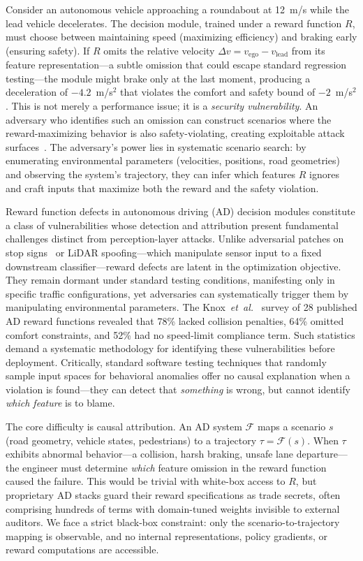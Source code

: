 \documentclass[journal]{IEEEtran}
\theoremstyle{plain}
\newcommand{\sys}{\mathcal{F}}
\begin{document}
Consider an autonomous vehicle approaching a roundabout at 12~m/s while the lead vehicle decelerates. The decision module, trained under a reward function $R$, must choose between maintaining speed (maximizing efficiency) and braking early (ensuring safety). If $R$ omits the relative velocity $\Delta v = v_{\text{ego}} - v_{\text{lead}}$ from its feature representation---a subtle omission that could escape standard regression testing---the module might brake only at the last moment, producing a deceleration of $-4.2$~m/s$^2$ that violates the comfort and safety bound of $-2$~m/s$^2$. This is not merely a performance issue; it is a \emph{security vulnerability}. An adversary who identifies such an omission can construct scenarios where the reward-maximizing behavior is also safety-violating, creating exploitable attack surfaces~\cite{white2023adversarial}. The adversary's power lies in systematic scenario search: by enumerating environmental parameters (velocities, positions, road geometries) and observing the system's trajectory, they can infer which features $R$ ignores and craft inputs that maximize both the reward and the safety violation.

Reward function defects in autonomous driving (AD) decision modules constitute a class of vulnerabilities whose detection and attribution present fundamental challenges distinct from perception-layer attacks. Unlike adversarial patches on stop signs~\cite{goodfellow2015explaining} or LiDAR spoofing---which manipulate sensor input to a fixed downstream classifier---reward defects are latent in the optimization objective. They remain dormant under standard testing conditions, manifesting only in specific traffic configurations, yet adversaries can systematically trigger them by manipulating environmental parameters. The Knox~\emph{et~al.}~\cite{knox2023reward} survey of 28 published AD reward functions revealed that 78\% lacked collision penalties, 64\% omitted comfort constraints, and 52\% had no speed-limit compliance term. Such statistics demand a systematic methodology for identifying these vulnerabilities before deployment. Critically, standard software testing techniques that randomly sample input spaces for behavioral anomalies offer no causal explanation when a violation is found---they can detect that \emph{something} is wrong, but cannot identify \emph{which feature} is to blame.

The core difficulty is causal attribution. An AD system $\sys$ maps a scenario $s$ (road geometry, vehicle states, pedestrians) to a trajectory $\tau = \sys(s)$. When $\tau$ exhibits abnormal behavior---a collision, harsh braking, unsafe lane departure---the engineer must determine \emph{which} feature omission in the reward function caused the failure. This would be trivial with white-box access to $R$, but proprietary AD stacks guard their reward specifications as trade secrets, often comprising hundreds of terms with domain-tuned weights invisible to external auditors. We face a strict black-box constraint: only the scenario-to-trajectory mapping is observable, and no internal representations, policy gradients, or reward computations are accessible.
\end{document}
